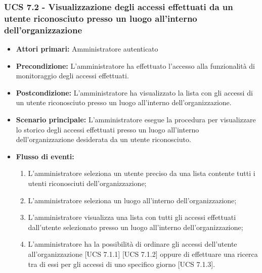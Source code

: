 \subsubsection{UCS 7.2 - Visualizzazione degli accessi effettuati da un utente riconosciuto presso un luogo all'interno dell'organizzazione}
\begin{itemize}
	\item \textbf{Attori primari:} Amministratore autenticato
	\item \textbf{Precondizione:} L'amministratore ha effettuato l'accesso alla funzionalità di monitoraggio degli accessi effettuati.
	\item \textbf{Postcondizione:} L'amministratore ha visualizzato la lista con gli accessi di un utente riconosciuto presso un luogo all'interno dell'organizzazione.
	\item \textbf{Scenario principale:} L'amministratore esegue la procedura per visualizzare lo storico degli accessi effettuati presso un luogo all'interno dell'organizzazione desiderata da un utente riconosciuto.
	\item \textbf{Flusso di eventi:}
	\begin{enumerate}
	\item L'amministratore seleziona un utente preciso da una lista contente tutti i utenti riconosciuti dell'organizzazione;
	\item L'amministratore seleziona un luogo all'interno dell'organizzazione;
	\item L'amministratore visualizza una lista con tutti gli accessi effettuati dall'utente selezionato presso un luogo all'interno dell'organizzazione;
	\item L'amministratore ha la possibilità di ordinare gli accessi dell'utente all'organizzazione [UCS 7.1.1] [UCS 7.1.2] oppure di effettuare una ricerca tra di essi per gli accessi di uno specifico giorno [UCS 7.1.3].
	\end{enumerate}
\end{itemize}




